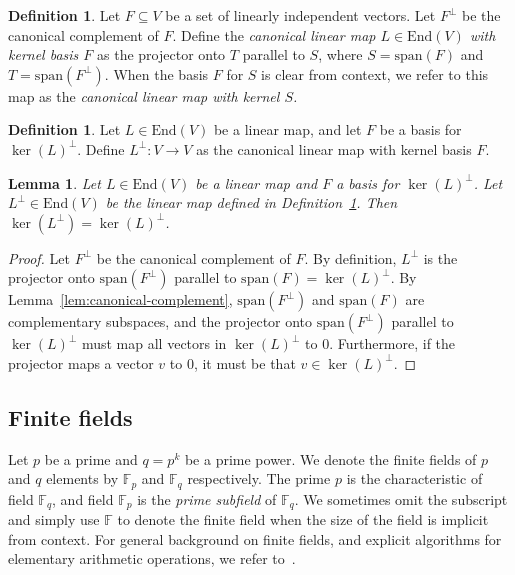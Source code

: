\documentclass[11pt]{article}
\newtheorem{lemma}[theorem]{Lemma}
\theoremstyle{definition}
\newtheorem{definition}[theorem]{Definition}
\newcommand{\F}{\ensuremath{\mathbb{F}}}
\newcommand{\Fp}{\F_p}
\newcommand{\Fq}{\F_q}
\newcommand{\End}{\mathrm{End}}
\begin{document}
\begin{definition}
  \label{def:cl-canonical}
  Let $F \subseteq V$ be a set of linearly independent vectors.
  Let $F^\perp$ be the canonical complement of $F$.
  Define the \emph{canonical linear map $L \in \End(V)$ with kernel basis $F$}
  as the projector onto $T$ parallel to $S$, where $S = \mathrm{span}(F)$ and $T
  = \mathrm{span}(F^\perp)$.
  When the basis $F$ for $S$ is clear from context, we refer to this map as the
  \emph{canonical linear map with kernel $S$.}
\end{definition}

\begin{definition}
  \label{def:Lperp}
  Let $L \in \End(V)$ be a linear map, and let $F$ be a basis for
  $\ker(L)^\perp$.
  Define $L^\perp : V \rightarrow V$ as the canonical linear map with kernel
  basis $F$.
\end{definition}

\begin{lemma}
  \label{lem:L_perp_perp}
  Let $L \in \End(V)$ be a linear map and $F$ a basis for $\ker(L)^\perp$.
  Let $L^\perp \in \End(V)$ be the linear map defined in
  Definition~\ref{def:Lperp}.
  Then $\ker(L^\perp) = \ker(L)^\perp$.
\end{lemma}

\begin{proof}
  Let $F^\perp$ be the canonical complement of $F$.
  By definition, $L^\perp$ is the projector onto $\mathrm{span}(F^\perp)$
  parallel to $\mathrm{span}(F) = \ker(L)^\perp$.
  By Lemma~\ref{lem:canonical-complement}, $\mathrm{span}(F^\perp)$ and
  $\mathrm{span}(F)$ are complementary subspaces, and the projector onto
  $\mathrm{span}(F^\perp)$ parallel to $\ker(L)^\perp$ must map all vectors in
  $\ker(L)^\perp$ to $0$.
  Furthermore, if the projector maps a vector $v$ to $0$, it must be that $v \in
  \ker(L)^\perp$.
\end{proof}

\subsection{Finite fields}
\label{sec:finite-fields}

Let $p$ be a prime and $q = p^k$ be a prime power.
We denote the finite fields of $p$ and $q$ elements by $\Fp$ and $\Fq$
respectively.
The prime $p$ is the characteristic of field $\Fq$, and field $\Fp$ is the
\emph{prime subfield} of $\Fq$.
We sometimes omit the subscript and simply use $\F$ to denote the finite field
when the size of the field is implicit from context.
For general background on finite fields, and explicit algorithms for elementary
arithmetic operations, we refer to~\cite{mullen2013handbook}.
\end{document}
